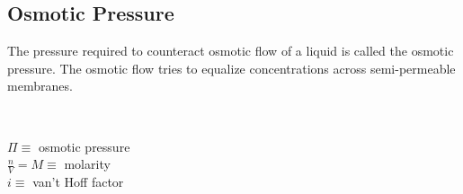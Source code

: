 \subsection{Osmotic Pressure}{
The pressure required to counteract osmotic flow of a liquid is called the osmotic pressure. The osmotic flow tries to equalize concentrations across semi-permeable membranes.\\
\begin{minipage}{0.3\linewidth}
    \\
\end{minipage}
\begin{minipage}{0.69\linewidth}
    $\Pi \equiv$ osmotic pressure\\
    $\frac{n}{V} = M \equiv$ molarity\\
    $i \equiv$ van't Hoff factor
\end{minipage}}



